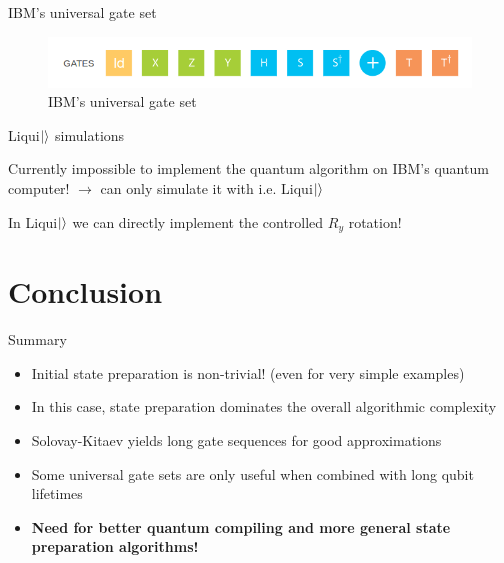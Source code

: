 \documentclass[10pt]{beamer}
\begin{document}
{
\begin{frame}{IBM's universal gate set}

\begin{figure}
\includegraphics[scale=0.45]{IBMgates.png}
       \caption{\footnotesize{IBM's universal gate set} }
\end{figure}
\vspace{10mm}

\end{frame}
}

{
\begin{frame}{Liqui$\ket{}$ simulations}
	
Currently impossible to implement the quantum algorithm on IBM's quantum computer!
$\rightarrow$ can only simulate it with i.e. Liqui$\ket{}$

In Liqui$\ket{}$ we can directly implement the controlled $R_y$ rotation!


\end{frame}
}

\section{Conclusion}

\begin{frame}{Summary}
\begin{itemize}
\item Initial state preparation is non-trivial! (even for very simple examples)
\item In this case, state preparation dominates the overall algorithmic complexity
\item Solovay-Kitaev yields long gate sequences for good approximations
\item Some universal gate sets are only useful when combined with long qubit lifetimes
\item \textbf{Need for better quantum compiling and more general state preparation algorithms!}
\end{itemize}
\end{frame}
\end{document}
